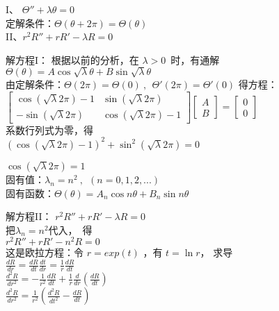 \begin{frame}	
	I、 $\displaystyle 	\Theta '' + \lambda \theta =0 $  \\ 
	定解条件：$\displaystyle 	\Theta(\theta +2 \pi )=\Theta (\theta)  $  \\ 
	II、$\displaystyle  r^2 R'' +r R' -\lambda R =0 $  \\   \vspace{0.6 cm}	
	
	解方程I：  根据以前的分析，在 $\lambda > 0 $ 时，有通解\\ 
	{ $\displaystyle  \Theta(\theta)=A\cos \sqrt{\lambda } \theta+B\sin \sqrt{\lambda }\theta$}\\ 
	由定解条件：$\displaystyle 	\Theta(2 \pi )=\Theta (0)~,~~ 	\Theta' (2 \pi )=\Theta' (0)  $ 得方程： \\ 
	$ \left [
	\begin{array}{lll}
		\cos (\sqrt {\lambda} 2\pi )-1  & \sin (\sqrt {\lambda} 2\pi )\\
		-\sin (\sqrt {\lambda} 2\pi ) & \cos (\sqrt {\lambda} 2\pi )-1
	\end{array} \right] 
	\left [
	\begin{array}{lll}
		A\\
		B
	\end{array} \right] 
	=
	\left [
	\begin{array}{lll}
		0\\
		0
	\end{array} \right]
	$ \\
	系数行列式为零，得\\
	$(\cos (\sqrt {\lambda} 2\pi )-1 ) ^2 + \sin ^2 (\sqrt {\lambda} 2\pi ) =0$ \\ 
\end{frame}	

\begin{frame}
	$\cos (\sqrt {\lambda} 2\pi)=1$   \\ 	
	固有值：$\lambda _n =n^2 ~,~~ (n=0,1,2,...)$  \\ 
	固有函数：$\displaystyle  \Theta(\theta)=A_n\cos n \theta +B_n \sin n \theta $\\   \vspace{0.6cm}

	解方程II：
	{$\displaystyle  r^2 R'' +r R' -\lambda R =0 $  } \\ 
	把$\lambda_n =n^2 $代入， 得 \\ 
	{$\displaystyle  r^2 R'' +r R' -n^2R =0 $  } \\ 
	这是欧拉方程：令 $ r=exp(t) $ ，有 $t=\ln r$， 求导 \\ 
	$ \displaystyle \frac{dR}{dr} =\frac{dR}{dt} \frac{dt}{dr} =\frac{1}{r} \frac{dR}{dt} $ \\ 
	$ \displaystyle \frac{d^2R}{dr^2} =-\frac{1}{r^2}\frac{dR}{dt} + \frac{1}{r} \frac{d}{dr} (\frac{dR}{dt} )$ \\ 
	$ \displaystyle \frac{d^2R}{dr^2} =\frac{1}{r^2} (\frac{d^2R}{dt^2}-\frac{dR}{dt} )$ \\ 		
\end{frame}	

